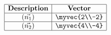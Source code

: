 \[
\begin{array}{|c|c|}
\hline
\textbf{Description} & \textbf{Vector} \\
\hline
\text{($\vec{n_1}$)} & \myvec{2\\-2} \\
\hline
\text{($\vec{n_2}$)} & \myvec{4\\-4} \\
\hline
\end{array}
\]